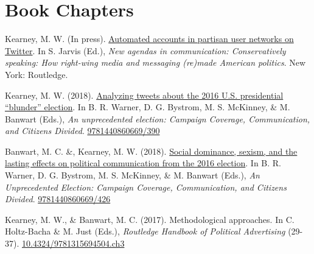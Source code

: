 \section{Book Chapters}
\begin{bibenum}

\item Kearney, M. W. (In press).
  \href{https://mkearney.github.io/utchapter}{Automated accounts in partisan user networks on Twitter}.
  In S. Jarvis (Ed.),
  \textit{New agendas in communication: Conservatively speaking: How right-wing media and messaging (re)made American politics}. New York: Routledge.

\item Kearney, M. W. (2018).
	\href{https://books.google.com/books?hl=en&lr=&id=CtVJDwAAQBAJ&oi=fnd&pg=PA383}{Analyzing tweets about the 2016 U.S. presidential ``blunder'' election}.
	In B. R. Warner, D. G. Bystrom, M. S. McKinney, \& M. Banwart (Eds.),
	\textit{An unprecedented election: Campaign Coverage, Communication, and Citizens Divided}.
	\href{http://publisher.abc-clio.com/9781440860669/390}{9781440860669/390}

\item Banwart, M. C. \&, Kearney, M. W. (2018).
	\href{https://books.google.com/books?hl=en&lr=&id=CtVJDwAAQBAJ&oi=fnd&pg=PA419}{Social dominance, sexism, and the lasting effects on political communication from the 2016 election}.
	In B. R. Warner, D. G. Bystrom, M. S. McKinney, \& M. Banwart (Eds.),
	\textit{An Unprecedented Election: Campaign Coverage, Communication, and Citizens Divided}.
	\href{http://publisher.abc-clio.com/9781440860669/426}{9781440860669/426}

\item[] Kearney, M. W., \& Banwart, M. C. (2017).
	Methodological approaches.
	In C. Holtz-Bacha \& M. Just (Eds.), \textit{Routledge Handbook of Political Advertising} (29-37).
	\href{https://www.routledgehandbooks.com/doi/10.4324/9781315694504.ch3}{10.4324/9781315694504.ch3}

\end{bibenum}
